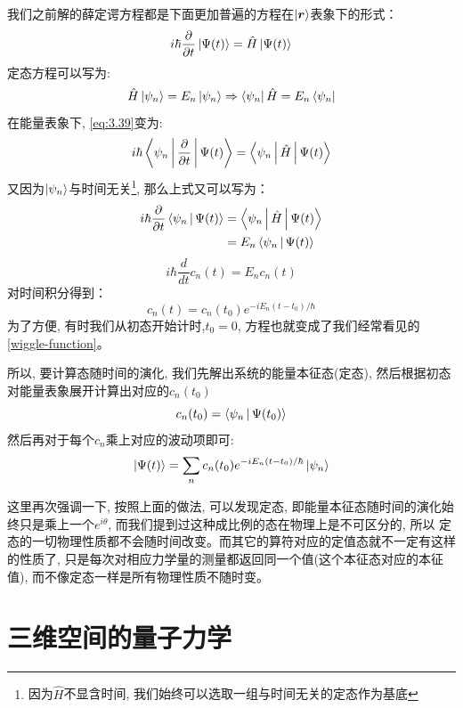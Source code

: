\documentclass[a4paper,zihao=-4,linespread=1]{ctexrep}
\newenvironment{lequation}{\large\begin{equation}}{\end{equation}}
\begin{document}
    我们之前解的薛定谔方程都是下面更加普遍的方程在$\ket{\bm{r}}$表象下的形式：
    \begin{lequation}
        \label{eq:3.39}
        i\hbar\frac{\partial}{\partial t}\ket{\Psi(t)}=\hat{H}\ket{\Psi(t)}
    \end{lequation}
    定态方程可以写为:
    \begin{lequation}
        \hat{H}\ket{\psi_n}=E_n\ket{\psi_n}\Rightarrow\bra{\psi_n}\hat{H}=E_n\bra{\psi_n}
    \end{lequation}
    在能量表象下, \ref{eq:3.39}变为:
    \[i\hbar\Braket{\psi_n|\frac{\partial}{\partial t}|\Psi(t)}=\Braket{\psi_n|\hat{H}|\Psi(t)}\]
    又因为$\ket{\psi_n}$与时间无关\footnote{因为$\hat H$不显含时间, 我们始终可以选取一组与时间无关的定态作为基底}, 那么上式又可以写为：
    \begin{align*}
        i\hbar\frac{\partial}{\partial t}\Braket{\psi_n|\Psi(t)}&=\Braket{\psi_n|\hat{H}|\Psi(t)}\\
        &=E_n\Braket{\psi_n|\Psi(t)}
    \end{align*}
    \[i\hbar\frac{d}{dt}c_n(t)=E_n c_n(t)\]
    对时间积分得到：
    \[c_n(t)=c_n(t_0)e^{-iE_n(t-t_0)/\hbar}\]
    为了方便, 有时我们从初态开始计时,$t_0=0$, 方程也就变成了我们经常看见的\ref{wiggle-function}。

    所以, 要计算态随时间的演化, 我们先解出系统的能量本征态(定态), 然后根据初态对能量表象展开计算出对应的$c_n(t_0)$
    $$c_n(t_0)=\Braket{\psi_n|\Psi(t_0)}$$
    然后再对于每个$c_n$乘上对应的波动项即可:
    \begin{equation}
        \ket{\Psi(t)}=\sum_n c_n(t_0)e^{-iE_n(t-t_0)/\hbar}\ket{\psi_n}
    \end{equation}

    这里再次强调一下, 按照上面的做法, 可以发现定态, 即能量本征态随时间的演化始终只是乘上一个$e^{i\theta}$, 而我们提到过这种成比例的态在物理上是不可区分的, 所以
    定态的一切物理性质都不会随时间改变。而其它的算符对应的定值态就不一定有这样的性质了, 只是每次对相应力学量的测量都返回同一个值(这个本征态对应的本征值), 而不像定态一样是所有物理性质不随时变。


    \chapter{三维空间的量子力学}
\end{document}
